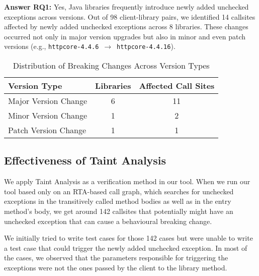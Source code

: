 \vspace{1em}
\begin{tcolorbox}[colback=gray!10, colframe=black]
\textbf{Answer RQ1:} Yes, Java libraries frequently introduce newly added unchecked exceptions across versions. Out of 98 client-library pairs, we identified 14 callsites affected by newly added unchecked exceptions across 8 libraries. These changes occurred not only in major version upgrades but also in minor and even patch versions (e.g., \texttt{httpcore-4.4.6}~$\rightarrow$~\texttt{httpcore-4.4.16}).
\end{tcolorbox}
\vspace{1em}

\begin{table}[h]
\centering
\caption{Distribution of Breaking Changes Across Version Types}
\label{tab:version-distribution}
\begin{tabular}{lcc}
\toprule
\textbf{Version Type} & \textbf{Libraries} & \textbf{Affected Call Sites} \\
\midrule
Major Version Change & 6 & 11 \\
Minor Version Change & 1 & 2 \\
Patch Version Change & 1 & 1 \\
\bottomrule
\end{tabular}
\end{table}

\subsection{Effectiveness of Taint Analysis}

We apply Taint Analysis as a verification method in our tool. When we run our tool based only on an RTA-based call graph, which
searches for unchecked exceptions in the transitively called method bodies as well as in the entry method's body, we get around
142 callsites that potentially might have an unchecked exception that can cause a behavioural breaking change.

We initially tried to write test cases for those 142 cases but were unable to write a test case that could trigger
the newly added unchecked exception. In most of the cases, we observed that the parameters responsible for triggering the 
exceptions were not the ones passed by the client to the library method.

